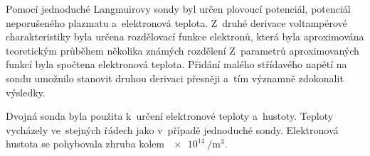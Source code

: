 \documentclass{protokol}
\begin{document}
Pomocí jednoduché Langmuirovy sondy byl určen plovoucí potenciál,
potenciál neporušeného plazmatu a~elektronová teplota.
Z~druhé derivace voltampérové charakteristiky byla určena rozdělovací
funkce elektronů,
která byla aproximována teoretickým průběhem několika známých rozdělení
Z~parametrů aproximovaných funkcí byla spočtena elektronová teplota.
Přidání malého střídavého napětí na sondu umožnilo stanovit druhou
derivaci přesněji a~tím významně zdokonalit výsledky.

Dvojná sonda byla použita k~určení elektronové teploty a~hustoty.
Teploty vycházely ve~stejných řádech jako v~případě jednoduché sondy.
Elektronová hustota se pohybovala zhruba kolem $\SI{e14}{\per\metre\cubed}$.

\printbibliography
\end{document}
